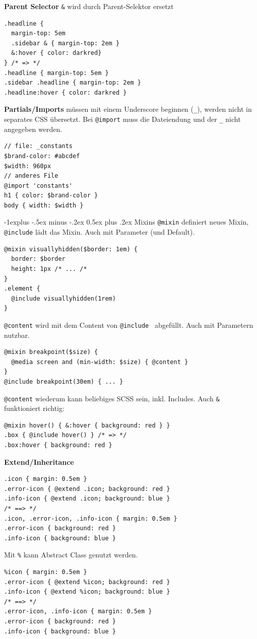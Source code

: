 \documentclass[a4paper, fontsize=6pt]{scrartcl}
\makeatletter
\renewcommand{\subsection}{\@startsection{subsection}{2}{0mm}%
    {-1explus -.5ex minus -.2ex}%
    {0.5ex plus .2ex}%
    {\normalfont\normalsize\bfseries}}
\newcommand{\scss}[1]{\texttt{#1}} %
\makeatother
\begin{document}
\begin{multicols*}{5}
\textbf{Parent Selector}
\scss{&} wird durch Parent-Selektor ersetzt
\begin{verbatim}
.headline {
  margin-top: 5em
  .sidebar & { margin-top: 2em }
  &:hover { color: darkred}
} /* => */
.headline { margin-top: 5em }
.sidebar .headline { margin-top: 2em }
.headline:hover { color: darkred }
\end{verbatim}

\textbf{Partials/Imports}
müssen mit einem Underscore beginnen (\scss{_}), werden nicht in separates CSS übersetzt. Bei \scss{@import} muss die Dateiendung und der \scss{_} nicht angegeben werden.

\begin{verbatim}
// file: _constants
$brand-color: #abcdef
$width: 960px
// anderes File
@import 'constants'
h1 { color: $brand-color }
body { width: $width }
\end{verbatim}

\subsection{Mixins}
\scss{@mixin} definiert neues Mixin, \scss{@include} lädt das Mixin. Auch mit Parameter (und Default).
\begin{verbatim}
@mixin visuallyhidden($border: 1em) {
  border: $border
  height: 1px /* ... /*
}
.element {
  @include visuallyhidden(1rem)
}
\end{verbatim}
\scss{@content} wird mit dem Content von \scss{@include {}} abgefüllt. Auch mit Parametern nutzbar.
\begin{verbatim}
@mixin breakpoint($size) {
  @media screen and (min-width: $size) { @content }
}
@include breakpoint(30em) { ... }
\end{verbatim}
\scss{@content} wiederum kann beliebiges SCSS sein, inkl. Includes. Auch \scss{&} funktioniert richtig:
\begin{verbatim}
@mixin hover() { &:hover { background: red } }
.box { @include hover() } /* => */
.box:hover { background: red }
\end{verbatim}

\textbf{Extend/Inheritance}
\begin{verbatim}
.icon { margin: 0.5em }
.error-icon { @extend .icon; background: red }
.info-icon { @extend .icon; background: blue }
/* ==> */
.icon, .error-icon, .info-icon { margin: 0.5em }
.error-icon { background: red }
.info-icon { background: blue }
\end{verbatim}
Mit \verb|%| kann Abstract Class genutzt werden.  %
\begin{verbatim}
%icon { margin: 0.5em }
.error-icon { @extend %icon; background: red }
.info-icon { @extend %icon; background: blue }
/* ==> */
.error-icon, .info-icon { margin: 0.5em }
.error-icon { background: red }
.info-icon { background: blue }
\end{verbatim}


\end{multicols*}
\end{document}
